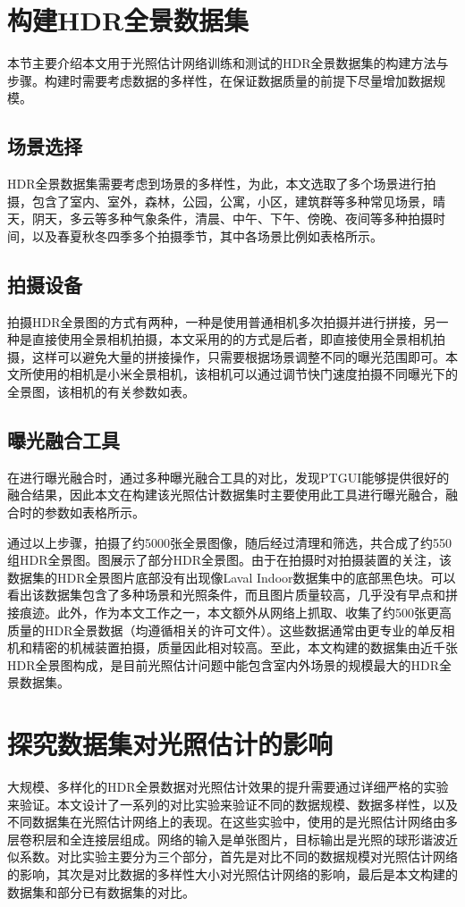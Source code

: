 \section{构建HDR全景数据集}
本节主要介绍本文用于光照估计网络训练和测试的HDR全景数据集的构建方法与步骤。构建时需要考虑数据的多样性，在保证数据质量的前提下尽量增加数据规模。
\subsection{场景选择}
HDR全景数据集需要考虑到场景的多样性，为此，本文选取了多个场景进行拍摄，包含了室内、室外，森林，公园，公寓，小区，建筑群等多种常见场景，晴天，阴天，多云等多种气象条件，清晨、中午、下午、傍晚、夜间等多种拍摄时间，以及春夏秋冬四季多个拍摄季节，其中各场景比例如表格所示。
\subsection{拍摄设备}
拍摄HDR全景图的方式有两种，一种是使用普通相机多次拍摄并进行拼接，另一种是直接使用全景相机拍摄，本文采用的的方式是后者，即直接使用全景相机拍摄，这样可以避免大量的拼接操作，只需要根据场景调整不同的曝光范围即可。本文所使用的相机是小米全景相机\cite{xiaomi}，该相机可以通过调节快门速度拍摄不同曝光下的全景图，该相机的有关参数如表。
\subsection{曝光融合工具}
在进行曝光融合时，通过多种曝光融合工具的对比，发现PTGUI\cite{ptgui}能够提供很好的融合结果，因此本文在构建该光照估计数据集时主要使用此工具进行曝光融合，融合时的参数如表格所示。

通过以上步骤，拍摄了约5000张全景图像，随后经过清理和筛选，共合成了约550组HDR全景图。图展示了部分HDR全景图。由于在拍摄时对拍摄装置的关注，该数据集的HDR全景图片底部没有出现像Laval Indoor数据集\cite{gardner2017learning}中的底部黑色块。可以看出该数据集包含了多种场景和光照条件，而且图片质量较高，几乎没有早点和拼接痕迹。此外，作为本文工作之一，本文额外从网络上抓取、收集了约500张更高质量的HDR全景数据（均遵循相关的许可文件）。这些数据通常由更专业的单反相机和精密的机械装置拍摄，质量因此相对较高。至此，本文构建的数据集由近千张HDR全景图构成，是目前光照估计问题中能包含室内外场景的规模最大的HDR全景数据集。

\section{探究数据集对光照估计的影响}
大规模、多样化的HDR全景数据对光照估计效果的提升需要通过详细严格的实验来验证。本文设计了一系列的对比实验来验证不同的数据规模、数据多样性，以及不同数据集在光照估计网络上的表现。在这些实验中，使用的是光照估计网络由多层卷积层和全连接层组成。网络的输入是单张图片，目标输出是光照的球形谐波近似系数。对比实验主要分为三个部分，首先是对比不同的数据规模对光照估计网络的影响，其次是对比数据的多样性大小对光照估计网络的影响，最后是本文构建的数据集和部分已有数据集的对比。

